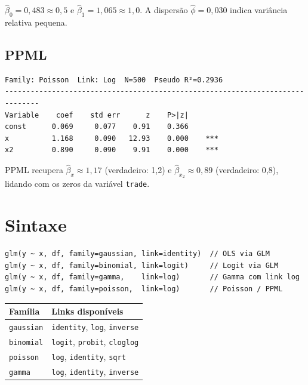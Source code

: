 $\hat\beta_0 = 0{,}483 \approx 0{,}5$ e $\hat\beta_1 = 1{,}065 \approx 1{,}0$.
A dispersão $\hat\phi = 0{,}030$ indica variância relativa pequena.

\subsection*{PPML}

\begin{lstlisting}[language={}, basicstyle=\ttfamily\small,
  frame=none, numbers=none, backgroundcolor=\color{codbg},
  xleftmargin=0pt, xrightmargin=0pt, breaklines=false]
Family: Poisson  Link: Log  N=500  Pseudo R²=0.2936
------------------------------------------------------------------------------
Variable    coef    std err      z    P>|z|
const      0.069     0.077    0.91    0.366
x          1.168     0.090   12.93    0.000    ***
x2         0.890     0.090    9.91    0.000    ***
\end{lstlisting}

PPML recupera $\hat\beta_x \approx 1{,}17$ (verdadeiro: 1{,}2) e
$\hat\beta_{x_2} \approx 0{,}89$ (verdadeiro: 0{,}8), lidando com os zeros
da variável \texttt{trade}.

\section{Sintaxe}

\begin{lstlisting}
glm(y ~ x, df, family=gaussian, link=identity)  // OLS via GLM
glm(y ~ x, df, family=binomial, link=logit)     // Logit via GLM
glm(y ~ x, df, family=gamma,    link=log)       // Gamma com link log
glm(y ~ x, df, family=poisson,  link=log)       // Poisson / PPML
\end{lstlisting}

\begin{center}
\begin{tabular}{ll}
\toprule
\textbf{Família} & \textbf{Links disponíveis} \\
\midrule
\texttt{gaussian}  & \texttt{identity}, \texttt{log}, \texttt{inverse} \\
\texttt{binomial}  & \texttt{logit}, \texttt{probit}, \texttt{cloglog} \\
\texttt{poisson}   & \texttt{log}, \texttt{identity}, \texttt{sqrt} \\
\texttt{gamma}     & \texttt{log}, \texttt{identity}, \texttt{inverse} \\
\bottomrule
\end{tabular}
\end{center}
